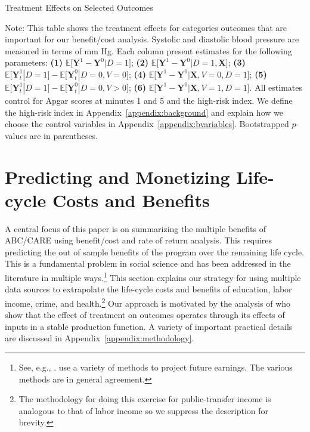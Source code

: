 \begin{table}[!htbp]
\centering
\begin{threeparttable}
\caption{Treatment Effects on Selected Outcomes}\label{table:tescombined}
\begin{scriptsize}

\end{scriptsize}
\begin{tablenotes}
\tiny
Note: This table shows the treatment effects for categories outcomes that are important for our benefit/cost analysis. Systolic and diastolic blood pressure are measured in terms of mm Hg. Each column present estimates for the following parameters: \textbf{(1)} $\mathbb{E} \big[ \bm{Y}^1 - \bm{Y}^0 | D = 1]$; {\textbf{(2)} $\mathbb{E} \big[ \bm{Y}^1 - \bm{Y}^0 | D = 1, \bm{X} \big]$}; {\textbf{(3)} $\mathbb{E} \big[ \bm{Y}^1_t | D=1 \big] - \mathbb{E} \big[ \bm{Y}^0_t | D=0, V=0 \big]$}; {\textbf{(4)} $\mathbb{E} \big[ \bm{Y}^1 - \bm{Y}^0 | \bm{X}, V=0, D = 1 \big] $}; {\textbf{(5)} $\mathbb{E} \big[ \bm{Y}^1_t | D=1 \big] - \mathbb{E} \big[ \bm{Y}^0_t | D=0, V>0 \big]$}; {\textbf{(6)} $\mathbb{E} \big[ \bm{Y}^1 - \bm{Y}^0 | \bm{X}, V=1 , D = 1\big]$}. All estimates control for Apgar scores at minutes 1 and 5 and the high-risk index. We define the high-risk index in Appendix~\ref{appendix:background} and explain how we choose the control variables in Appendix~\ref{appendix:bvariables}. Bootstrapped $p$-values are in parentheses.
\end{tablenotes}
\end{threeparttable}
\end{table}
\restoregeometry
\doublespacing


\section{Predicting and Monetizing Life-cycle Costs and Benefits}\label{section:cbamethodology}

A central focus of this paper is on summarizing the multiple benefits of ABC/CARE using benefit/cost and rate of return analysis. This requires predicting the out of sample benefits of the program over the remaining life cycle. This is a fundamental problem in social science and has been addressed in the literature in multiple ways.\footnote{See, e.g., \cite{Heckman_Lochner_ea_2006_HEE}. \citet{Heckman_Moon_etal_2010_RateofReturn} use a variety of methods to project future earnings. The various methods are in general agreement.} This section explains our strategy for using multiple data sources to extrapolate the life-cycle costs and benefits of education, labor income, crime, and health.\footnote{The methodology for doing this exercise for public-transfer income is analogous to that of labor income so we suppress the description for brevity.} Our approach is motivated by the analysis of \citet{Heckman_Pinto_etal_2013_PerryFactor} who show that the effect of treatment on outcomes operates through its effects of inputs in a stable production function. A variety of important practical details are discussed in Appendix~\ref{appendix:methodology}.

